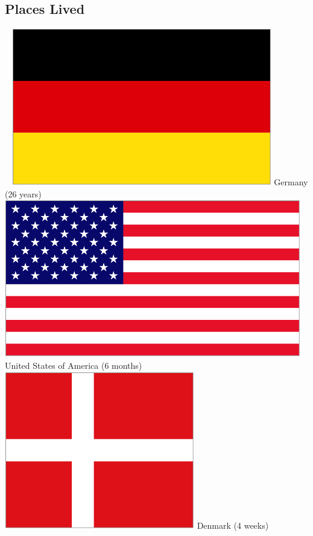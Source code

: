 \documentclass[]{friggeri-cv}
\begin{document}
\begin{aside}
    \section{Places Lived}
    ~
    \includegraphics[scale=0.08]{img/ger.png}
    Germany (26 years)
    ~
    \includegraphics[scale=0.07]{img/usa.png}
    United States of America (6 months)
    ~
    \includegraphics[scale=0.11]{img/den.png}
    Denmark (4 weeks)
    ~

\end{aside}
\end{document}
